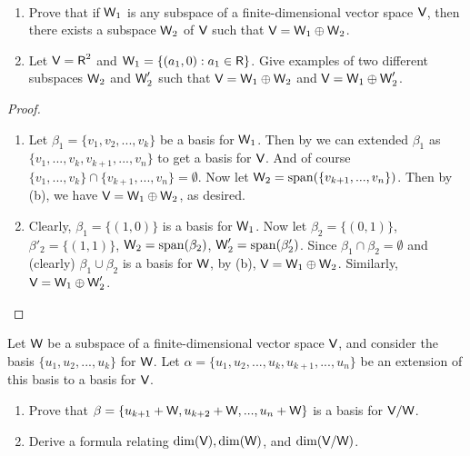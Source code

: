 \begin{exercise} \label{exercise 1.6.34}\ 

\begin{enumerate}
\item Prove that if \(\textsf{W}_1\) is any subspace of a finite-dimensional vector space \(\textsf{V}\), then there exists a subspace \(\textsf{W}_2\) of \(\textsf{V}\) such that \(\textsf{V} = \textsf{W}_1 \oplus \textsf{W}_2\).
\item Let \(\textsf{V} = \textsf{R}^2\) and \(\textsf{W}_1 = \{ (a_1, 0) : a_1 \in \textsf{R} \}\).
    Give examples of two different subspaces \(\textsf{W}_2\) and \(\textsf{W}'_2\) such that \(\textsf{V} = \textsf{W}_1 \oplus \textsf{W}_2\) and \(\textsf{V} = \textsf{W}_1 \oplus \textsf{W}'_2\).
\end{enumerate}
\end{exercise}

\begin{proof} \ 
\begin{enumerate}
\item Let \(\beta_1 = \{ v_1, v_2, ..., v_k \}\) be a basis for \(\textsf{W}_1\).
    Then by \CORO{1.11.1} we can extended \(\beta_1\) as \(\{v_1, ..., v_k, v_{k + 1}, ..., v_n \}\) to get a basis for \(\textsf{V}\).
    And of course \(\{ v_1, ..., v_k \} \cap \{ v_{k + 1}, ..., v_n \} = \emptyset\).
    Now let \(\textsf{W}_2 = \operatorname{span}(\{ v_{k + 1}, ..., v_n \})\).
    Then by (b), we have \(\textsf{V} = \textsf{W}_1 \oplus \textsf{W}_2\), as desired.
\item Clearly, \(\beta_1 = \{ (1, 0) \}\) is a basis for \(\textsf{W}_1\).
    Now let \(\beta_2 = \{ (0, 1) \}\), \(\beta'_2 = \{ (1, 1) \}\), \(\textsf{W}_2 = \operatorname{span}(\beta_2)\), \(\textsf{W}'_2 = \operatorname{span}(\beta'_2)\).
    Since \(\beta_1 \cap \beta_2 = \emptyset\) and (clearly) \(\beta_1 \cup \beta_2\) is a basis for \(\textsf{W}\), by \EXEC{1.6.33}(b), \(\textsf{V} = \textsf{W}_1 \oplus \textsf{W}_2\).
    Similarly, \(\textsf{V} = \textsf{W}_1 \oplus \textsf{W}'_2\).
\end{enumerate}
\end{proof}

\begin{exercise} \label{exercise 1.6.35}
Let \(\textsf{W}\) be a subspace of a finite-dimensional vector space \(\textsf{V}\), and consider the basis \(\{ u_1, u_2, ..., u_k \}\) for \(\textsf{W}\).
Let \(\alpha = \{ u_1, u_2, ..., u_k, u_{k + 1}, ..., u_n \}\) be an extension of this basis to a basis for \(\textsf{V}\).
\begin{enumerate}
\item Prove that \(\beta = \{ u_{k + 1} + \textsf{W}, u_{k + 2} + \textsf{W}, ..., u_n + \textsf{W} \}\) is a basis for \(\textsf{V} / \textsf{W}\).
\item Derive a formula relating \(\dim(\textsf{V}), \dim(\textsf{W})\), and \(\dim(\textsf{V}/\textsf{W})\).
\end{enumerate}
\end{exercise}

